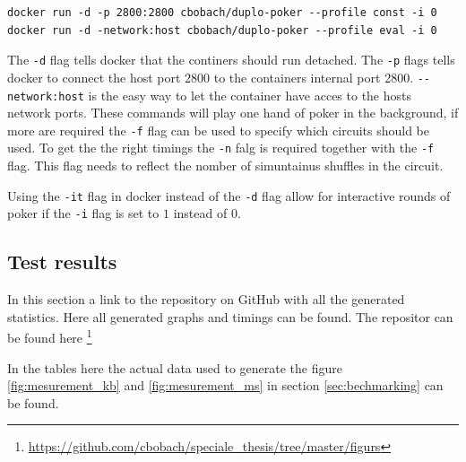\documentclass[twoside,11pt,openright]{report}
\begin{document}
\begin{appendices}
\begin{center}
\begin{verbatim}
docker run -d -p 2800:2800 cbobach/duplo-poker --profile const -i 0
docker run -d -network:host cbobach/duplo-poker --profile eval -i 0
\end{verbatim}
\end{center}

The \verb|-d| flag tells docker that the continers should run detached. The \verb|-p| flags tells docker to connect the host port $2800$ to the containers internal port 2800. \verb|--network:host| is the easy way to let the container have acces to the hosts network ports. These commands will play one hand of poker in the background, if more are required the \verb|-f| flag can be used to specify which circuits should be used. To get the the right timings the \verb|-n| falg is required together with the \verb|-f| flag. This flag needs to reflect the nomber of simuntainus shuffles in the circuit.

Using the \verb|-it| flag in docker instead of the \verb|-d| flag allow for interactive rounds of poker if the \verb|-i| flag is set to $1$ instead of $0$.


\subsection{Test results}
\label{app:test-res}
In this section a link to the repository on GitHub with all the generated statistics. Here all generated graphs and timings can be found. The repositor can be found here \footnote{\url{https://github.com/cbobach/speciale_thesis/tree/master/figurs}}

\bigskip

In the tables here the actual data used to generate the figure \ref{fig:mesurement_kb} and \ref{fig:mesurement_ms} in section \ref{sec:bechmarking} can be found.

\begin{table}
\centering

    \begin{subtable}{\textwidth}
    \label{table:const_kb}
    \centering
    \caption{$Constructor$}
    \end{subtable}%
    

\end{table}
\end{appendices}
\end{document}
